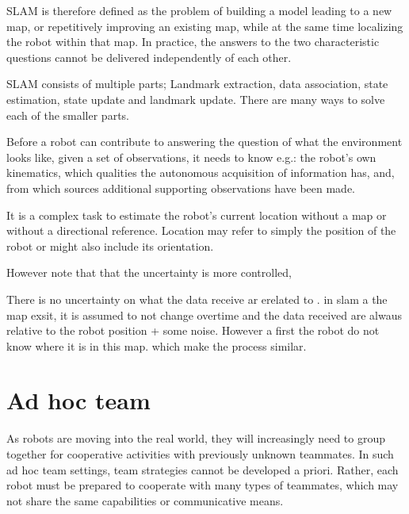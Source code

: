 SLAM is therefore defined as the problem of building a model leading to a new map, or repetitively improving an existing map, while at the same time localizing the robot within that map. In practice, the answers to the two characteristic questions cannot be delivered independently of each other.

SLAM consists of multiple parts; Landmark extraction, data association, state estimation, state update and landmark update. There are many ways to solve each of the smaller parts.

Before a robot can contribute to answering the question of what the environment looks like, given a set of observations, it needs to know e.g.: the robot's own kinematics, which qualities the autonomous acquisition of information has, and, from which sources additional supporting observations have been made.

It is a complex task to estimate the robot's current location without a map or without a directional reference. Location may refer to simply the position of the robot or might also include its orientation.

However note that that the uncertainty is more controlled, 

There is no uncertainty on what the data receive ar erelated to . in slam a the map exsit, it is assumed to not change overtime and the data received are alwaus relative to the robot position + some noise. However a first the robot do not know where it is in this map. which make the process similar.

\section{Ad hoc team}

As robots are moving into the real world, they will increasingly need to group together for cooperative activities with previously unknown teammates. In such ad hoc team settings, team strategies cannot be developed a priori. Rather, each robot must be prepared to cooperate with many types of teammates, which may not share the same capabilities or communicative means. 

